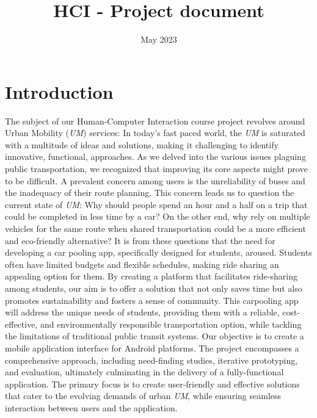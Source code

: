 \documentclass{article}
\title{HCI - Project document}
\date{May 2023}
\begin{document}
\maketitle

\section{Introduction}
The subject of our Human-Computer Interaction course project revolves around Urban Mobility (\textit{UM}) services: In today's fast paced world, the \textit{UM} is saturated with a multitude of ideas and solutions, making it challenging to identify innovative, functional, approaches. As we delved into the various issues plaguing public transportation, we recognized that improving its core aspects might prove to be difficult. A prevalent concern among users is the unreliability of buses and the inadequacy of their route planning. \newline
This concern leads us to question the current state of \textit{UM}: Why should people spend an hour and a half on a trip that could be completed in less time by a car? On the other end, why rely on multiple vehicles for the same route when shared transportation could be a more efficient and eco-friendly alternative? It is from these questions that the need for developing a car pooling app, specifically designed for students, aroused. Students often have limited budgets and flexible schedules, making ride sharing an appealing option for them. By creating a platform that facilitates ride-sharing among students, our aim is to offer a solution that not only saves time but also promotes sustainability and fosters a sense of community. This carpooling app will address the unique needs of students, providing them with a reliable, cost-effective, and environmentally responsible transportation option, while tackling the limitations of traditional public transit systems. \newline
Our objective is to create a mobile application interface for Android platforms. The project encompasses a comprehensive approach, including need-finding studies, iterative prototyping, and evaluation, ultimately culminating in the delivery of a fully-functional application. The primary focus is to create user-friendly and effective solutions that cater to the evolving demands of urban \textit{UM}, while ensuring seamless interaction between users and the application. \newline \newline
\end{document}
